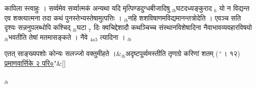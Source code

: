 \documentclass[article,12pt,a4paper]{memoir}%
\newcommand{\add}[1]{($^{+}$#1)}
\newcounter{parCount}
\begin{document}
	  
	  \pstart \leavevmode%
	\hphantom{.}{\color{DodgerBlue3}कापिला} स्त्वाहुः । सर्व्वमेव सर्व्वात्मकं अन्यथा यदि मृत्पिण्डदुग्धबीजादिषु {\tiny $_{lb}$}घटदध्यङ्कुराद {\tiny $_{6}$} यो न विद्यन्त एव शक्त्यात्मना तदा कथं पुनस्तेभ्यस्तेषामुत्पत्तिः । {\tiny $_{lb}$}नहि शशविषाणमविद्यमानन्तत्रोदेति । एवञ्च सति दृश्यः सन्ननुपलब्धोपि कश्चिद् {\tiny $_{lb}$}घटा {\tiny $_{7}$} दिः क्वचिद्देशादौ कथञ्चिच्च संस्थानविशेषादिना नैवाभावव्यवहारविषयो {\tiny $_{lb}$}भवतीति तेषां मतमासङ्कते । {\color{DodgerBlue3}नैवे} {\tiny $_{4a3}$} त्यादिना ।
	{}
	\pend%
      {\tiny $_{lb}$}
	  \bigskip
	  \begingroup
	
	    
	    \stanza[\smallbreak]
	  एतत् साङ्ख्यपशोः कोन्यः सलज्जो वक्तुमीहते ।&{\tiny $_{lb}$}अदृष्टपूर्व्वमस्तीति तृणाग्रे करिणां शतम् \add{। १२} \href{http://sarit.indology.info/?cref=pv.2.0}{प्रमाणवार्त्तिके २ परि०}{\normalfontlatin\large\qquad{}"}\&[\smallbreak]
	  
	  
	  
	  \endgroup
	{\tiny $_{lb}$}
\end{document}
